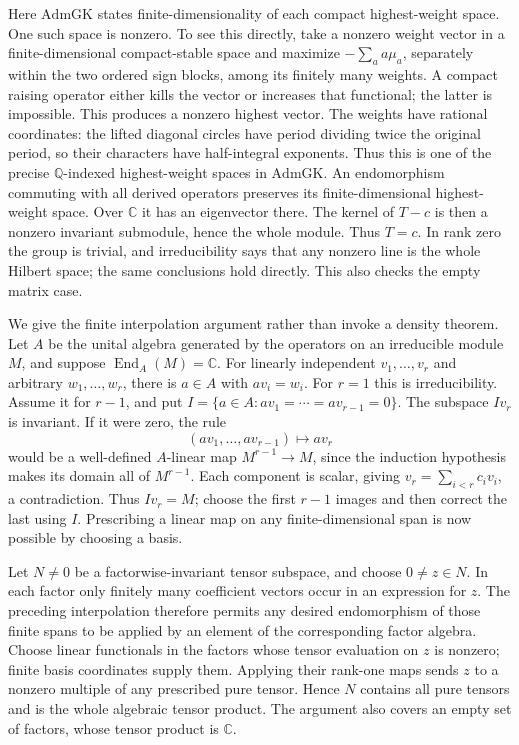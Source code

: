 Here \(\mathrm{AdmGK}\) states finite-dimensionality of each compact
highest-weight space. One such space is nonzero. To see this directly,
take a nonzero weight vector in a finite-dimensional compact-stable
space and maximize \(-\sum_a a\mu_a\), separately within the two
ordered sign blocks, among its finitely many weights. A compact
raising operator either kills the vector or increases that functional;
the latter is impossible. This produces a nonzero highest vector.
The weights have rational coordinates: the lifted diagonal circles
have period dividing twice the original period, so their characters
have half-integral exponents. Thus this is one of the precise
\(\mathbb Q\)-indexed highest-weight spaces in \(\mathrm{AdmGK}\).
An endomorphism commuting with all derived operators preserves its
finite-dimensional highest-weight space. Over \(\mathbb C\) it has
an eigenvector there. The kernel of \(T-c\) is then a nonzero invariant
submodule, hence the whole module. Thus \(T=c\). In rank zero the
group is trivial, and irreducibility says that any nonzero line is the
whole Hilbert space; the same conclusions hold directly. This also
checks the empty matrix case.

We give the finite interpolation argument rather than invoke a density
theorem. Let \(A\) be the unital algebra generated by the operators
on an irreducible module \(M\), and suppose
\(\operatorname{End}_A(M)=\mathbb C\). For linearly independent
\(v_1,\ldots,v_r\) and arbitrary \(w_1,\ldots,w_r\), there is
\(a\in A\) with \(av_i=w_i\). For \(r=1\) this is irreducibility.
Assume it for \(r-1\), and put
\(I=\{a\in A:av_1=\cdots=av_{r-1}=0\}\).
The subspace \(Iv_r\) is invariant. If it were zero, the rule
\[
       (av_1,\ldots,av_{r-1})\longmapsto av_r
 \tag{DI.9}
\]
would be a well-defined \(A\)-linear map \(M^{r-1}\to M\), since
the induction hypothesis makes its domain all of \(M^{r-1}\).
Each component is scalar, giving \(v_r=\sum_{i<r}c_iv_i\), a
contradiction. Thus \(Iv_r=M\); choose the first \(r-1\) images
and then correct the last using \(I\). Prescribing a linear map on
any finite-dimensional span is now possible by choosing a basis.

Let \(N\ne0\) be a factorwise-invariant tensor subspace, and choose
\(0\ne z\in N\). In each factor only finitely many coefficient
vectors occur in an expression for \(z\). The preceding interpolation
therefore permits any desired endomorphism of those finite spans to
be applied by an element of the corresponding factor algebra. Choose
linear functionals in the factors whose tensor evaluation on \(z\)
is nonzero; finite basis coordinates supply them. Applying their
rank-one maps sends \(z\) to a nonzero multiple of any prescribed
pure tensor. Hence \(N\) contains all pure tensors and is the whole
algebraic tensor product. The argument also covers an empty set of
factors, whose tensor product is \(\mathbb C\).

